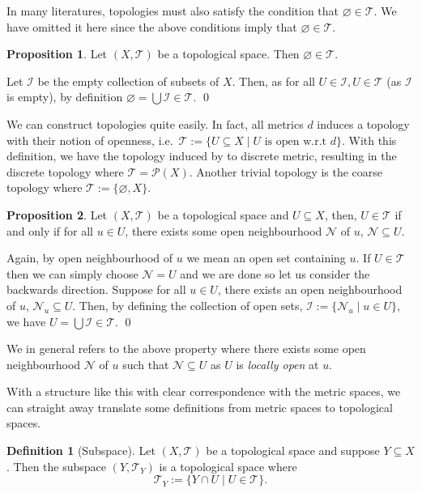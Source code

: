 \documentclass[
]{article}
\theoremstyle{definition}
\newtheorem{prop}{Proposition}
\theoremstyle{definition}
\newtheorem{definition}{Definition}[section]
\begin{document}
In many literatures, topologies must also satisfy the condition that
\(\varnothing \in \mathcal{T}\). We have omitted it here since the above
conditions imply that \(\varnothing \in \mathcal{T}\).

\begin{prop}
  Let \((X, \mathcal{T})\) be a topological space. Then \(\varnothing \in \mathcal{T}\).
\end{prop}
\proof

Let \(\mathcal{I}\) be the empty collection of subsets of \(X\). Then,
as for all \(U \in \mathcal{I}, U \in \mathcal{T}\) (as \(\mathcal{I}\)
is empty), by definition
\(\varnothing = \bigcup \mathcal{I} \in \mathcal{T}\). \qed

We can construct topologies quite easily. In fact, all metrics \(d\)
induces a topology with their notion of openness,
i.e.~\(\mathcal{T} := \{U \subseteq X \mid U \text{ is open w.r.t } d\}\).
With this definition, we have the topology induced by to discrete
metric, resulting in the discrete topology where
\(\mathcal{T} = \mathcal{P}(X)\). Another trivial topology is the coarse
topology where \(\mathcal{T} := \{\varnothing, X\}\).

\begin{prop}
  Let \((X, \mathcal{T})\) be a topological space and \(U \subseteq X\), then, 
  \(U \in \mathcal{T}\) if and only if for all \(u \in U\), there exists some 
  open neighbourhood \(\mathcal{N}\) of \(u\), \(\mathcal{N} \subseteq U\).
\end{prop}

Again, by open neighbourhood of \(u\) we mean an open set containing
\(u\). \proof If \(U \in \mathcal{T}\) then we can simply choose
\(\mathcal{N} = U\) and we are done so let us consider the backwards
direction. Suppose for all \(u \in U\), there exists an open
neighbourhood of \(u\), \(\mathcal{N}_u \subseteq U\). Then, by defining
the collection of open sets,
\(\mathcal{I} := \{\mathcal{N}_u \mid u \in U\}\), we have
\(U = \bigcup \mathcal{I} \in \mathcal{T}\). \qed

We in general refers to the above property where there exists some open
neighbourhood \(\mathcal{N}\) of \(u\) such that
\(\mathcal{N} \subseteq U\) as \(U\) is \emph{locally open} at \(u\).

With a structure like this with clear correspondence with the metric
spaces, we can straight away translate some definitions from metric
spaces to topological spaces.

\begin{definition}[Subspace]
  Let \((X, \mathcal{T})\) be a topological space and suppose \(Y \subseteq X\). 
  Then the subspace \((Y, \mathcal{T}_Y)\) is a topological space where 
  \[\mathcal{T}_Y := \{Y \cap U \mid U \in \mathcal{T}\}.\]
\end{definition}
\end{document}
